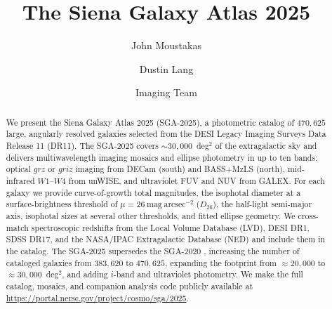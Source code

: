 \documentclass[modern,linenumbers]{aastex701}
\begin{document}
\title{The Siena Galaxy Atlas 2025}


\author[0000-0002-2733-4559]{John Moustakas}

\author[0000-0002-1172-0754]{Dustin Lang}


\author{Imaging Team}


\begin{abstract}

We present the Siena Galaxy Atlas 2025 (SGA-2025), a photometric
catalog of $470{,}625$ large, angularly resolved galaxies selected from
the DESI Legacy Imaging Surveys Data Release 11 (DR11). The SGA-2025
covers $\sim\!30{,}000$~deg$^{2}$ of the extragalactic sky and
delivers multiwavelength imaging mosaics and ellipse photometry in up
to ten bands: optical $grz$ or $griz$ imaging from DECam (south) and
BASS+MzLS (north), mid-infrared $W1$--$W4$ from unWISE, and
ultraviolet FUV and NUV from GALEX. For each galaxy we provide
curve-of-growth total magnitudes, the isophotal diameter at a
surface-brightness threshold of $\mu = 26~\mathrm{mag~arcsec^{-2}}$
($D_{26}$), the half-light semi-major axis, isophotal sizes at several
other thresholds, and fitted ellipse geometry. We cross-match
spectroscopic redshifts from the Local Volume Database (LVD), DESI DR1,
SDSS DR17, and the NASA/IPAC Extragalactic Database (NED) and include
them in the catalog. The SGA-2025 supersedes the SGA-2020
\citep{moustakas23a}, increasing the number of cataloged galaxies from
$383{,}620$ to $470{,}625$, expanding the footprint from
$\approx\!20{,}000$ to $\approx\!30{,}000$~deg$^{2}$, and adding $i$-band
and ultraviolet photometry. We make the full catalog, mosaics, and companion
analysis code publicly available at
\url{https://portal.nersc.gov/project/cosmo/sga/2025}.

\end{abstract}


\end{document}
